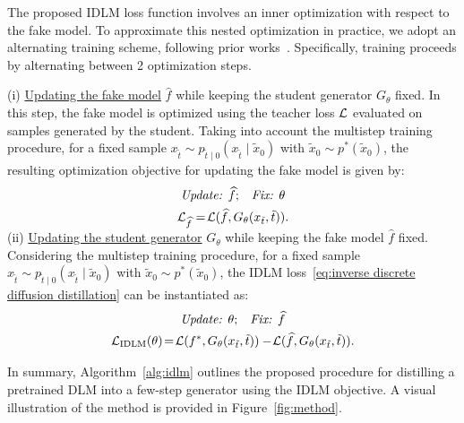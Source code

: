     The proposed IDLM loss function involves an inner optimization with respect to the fake model.
    To approximate this nested optimization in practice, we adopt an alternating training scheme,
    following prior works~\citep{yin2024one, yin2024improved, gushchin2025inverse, kornilov2025universal}.
Specifically, training proceeds by alternating between 2 optimization steps.

    (i) \underline{Updating the fake model} $\widehat{f}$ while keeping the student generator $G_{\theta}$ fixed. In this step, the fake model is optimized using the teacher loss $\mathcal{L}$ evaluated on samples generated by the student. Taking into account the multistep training procedure, for a fixed sample $x_{\tilde{t}} \sim p_{\tilde{t} \mid 0}(x_{\tilde{t}} \mid \tilde{x}_0)$ with $\tilde{x}_0 \sim p^*(\tilde{x}_0)$, the resulting optimization objective for updating the fake model is given by:
    \vspace{-2mm}
    \begin{gather}
    \label{eq:update fake in practice}
      \text{\textit{Update:} } \widehat{f} \text{;} \quad \text{\textit{Fix:} } \theta  \\
      \LC_{\widehat{f}} = \! \LC(\widehat{f}, G_{\theta}(x_{\tilde{t}}, \tilde{t})). \nonumber
    \vspace{-2mm}
    \end{gather}
    (ii) \underline{Updating the student generator} $G_{\theta}$ while keeping the fake model $\widehat{f}$ fixed. Considering the multistep training procedure, for a fixed sample $x_{\tilde{t}} \sim p_{\tilde{t} \mid 0}(x_{\tilde{t}} \mid \tilde{x}_0)$ with $\tilde{x}_0 \sim p^*(\tilde{x}_0)$, the IDLM loss~\eqref{eq:inverse discrete diffusion distillation} can be instantiated as:
    \vspace{-2mm}
    \begin{gather}
        \label{eq:update generator in practice}
        \text{\textit{Update:} } \theta \text{;} \quad \text{\textit{Fix:} } \widehat{f} \\
        \mathcal{L}_{\text{IDLM}}(\theta) \!=\! \mathcal{L}(f^*, G_{\theta}(x_{\tilde{t}}, \tilde{t}))-
      \! \mathcal{L}(\widehat{f}, G_{\theta}(x_{\tilde{t}}, \tilde{t})). \nonumber
    \end{gather}
    
\vspace{-3mm}
  In summary, Algorithm~\ref{alg:idlm} outlines the proposed procedure for distilling a pretrained DLM into a few-step generator using the IDLM objective. A visual illustration of the method is provided in Figure~\ref{fig:method}.
